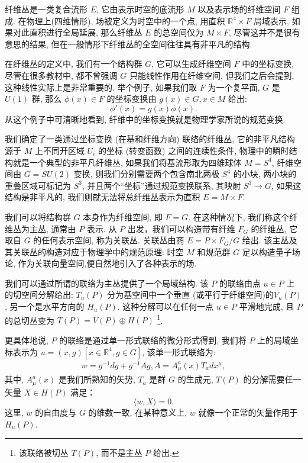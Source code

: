 \documentclass{article}
\begin{document}
纤维丛是一类复合流形 $E$, 它由表示时空的底流形 $M$ 以及表示场的纤维空间 $F$ 组成. 在物理上(四维情形), 场被定义为时空中的一个点, 用直积 $\mathbb{R}^{4}\times F$ 局域表示, 如果对此直积进行全局延展, 那么纤维丛 $E$ 的总空间仅为 $ M\times F$, 尽管这并不是很有意思的结果, 但在一般情形下纤维丛的全空间往往具有非平凡的结构.

在纤维丛的定义中, 我们有一个结构群 $G$, 它可以生成纤维空间 $F$ 中的坐标变换, 尽管在很多教材中, 都不曾强调 $G$ 只能线性作用在纤维空间, 但我们之后会提到, 这种线性实际上是非常重要的. 举个例子, 如果我们取 $F$ 为一个复平面, $G$ 是 $U(1)$ 群, 那么 $\phi(x) \in F$ 的坐标变换由 $g(x) \in G, x \in M$ 给出:
\begin{equation}
\phi'(x)=g(x)\phi(x).
\end{equation}
从这个例子中可清晰地看到, 纤维中的坐标变换就是物理学家所说的规范变换.

我们确定了一类通过坐标变换 (在基和纤维方向) 联络的纤维丛, 它的非平凡结构源于 $M$ 上不同开区域 $U_{i}$ 的坐标 (转变函数) 之间的连续性条件, 物理中的瞬时结构就是一个典型的非平凡纤维丛, 如果我们将基流形取为四维球体 $M = S^{4}$, 纤维空间由 $G = SU(2)$ 变换, 则我们分别需要两个包含南北两极 $S^{4}$ 的小块, 两小块的重叠区域可标记为 $S^{3}$,  并且两个“坐标”通过规范变换联系, 其映射 $S^{3}\rightarrow G$, 如果这结构是非平凡的, 我们则就无法将总纤维丛表示为直积 $E = M\times F$.

\par 我们可以将结构群 $G$ 本身作为纤维空间, 即 $F = G$. 在这种情况下, 我们称这个纤维丛为主丛, 通常由 $P$ 表示. 从 $P$ 出发，我们可以构造带有纤维 $F_{G}$ 的纤维丛, 它取自 $G$ 的任何表示空间, 称为关联丛. 关联丛由商 $E = P\times F_{G}/G$ 给出. 该主丛及其关联丛的构造对应于物理学中的规范原理: 时空 $M$ 和规范群 $G$ 足以构造量子场论, 作为关联向量空间,便自然地引入了各种表示的场.

\par 我们可以通过所谓的联络为主丛提供了一个局域结构. 该 $P$ 的联络由点 $u \in P$ 上的切空间分解给出: $T_{u}(P)$  分为基空间中一个垂直 (或平行于纤维空间)的$V_{u}(P)$, 另一个是水平方向的 $H_{u}(P)$. 这种分解可以在任何一点 $u\in P$ 平滑地完成, 且 $P$ 的总切丛变为 $T(P)= V(P)\oplus H(P)$ \footnote{该联络被切丛 $T(P)$, 而不是主丛 $P$ 给出.}.

\par 更具体地说, $P$ 的联络是通过单一形式联络的微分形式得到, 我们将 $P$ 上的局域坐标表示为 $u =(x, g)[x\in \mathbb{R}^{4}, g\in G]$, 该单一形式联络为:
\begin{align}
w = g^{-1}dg+g^{-1}Ag, A=A_{\mu}^{a}(x)T_{a}dx^{\mu},
\end{align}
其中, $A_{\mu}^{a}(x)$ 是我们所熟知的矢势, $T_{a}$ 是群 $G$ 的生成元, $T(P)$ 的分解需要任一矢量 $X \in H(P)$ 满足：
\begin{equation}
\langle w, X\rangle=0.
\end{equation}
这里, $w$ 的自由度与 $G$ 的维数一致, 在某种意义上, $w$ 就像一个正常的矢量作用于 $H_{u}(P)$.
\end{document}
